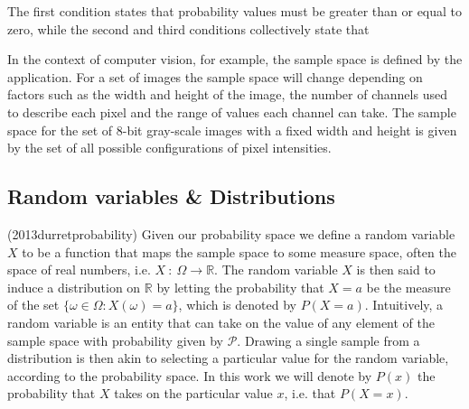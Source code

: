 The first condition states that probability values must be greater than or equal to zero, while the second and third conditions collectively state that 

In the context of computer vision, for example, the sample space is defined by the application. For a set of images the sample space will change depending on factors such as the width and height of the image, the number of channels used to describe each pixel and the range of values each channel can take. The sample space for the set of 8-bit gray-scale images with a fixed width and height is given by the set of all possible configurations of pixel intensities. 

\subsection{Random variables \& Distributions}

(2013durretprobability)
Given our probability space we define a random variable $X$ to be a function that maps the sample space to some measure space, often the space of real numbers, i.e. $X\: : \: \Omega \rightarrow \mathbb{R}$. The random variable $X$ is then said to induce a distribution on $\mathbb{R}$ by letting the probability that $X = a$ be the measure of the set $\{\omega \in \Omega : X(\omega) = a\}$, which is denoted by $P(X = a)$. Intuitively, a random variable is an entity that can take on the value of any element of the sample space with probability given by $\mathcal{P}$. Drawing a single sample from a distribution is then akin to selecting a particular value for the random variable, according to the probability space. In this work we will denote by $P(x)$ the probability that $X$ takes on the particular value $x$, i.e. that $P(X = x)$. 

